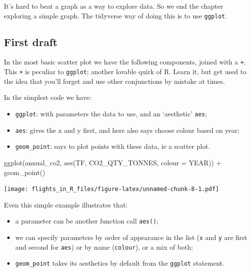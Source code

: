 \documentclass[
]{book}
\newenvironment{Shaded}{\begin{snugshade}}{\end{snugshade}}
\newcommand{\AttributeTok}[1]{\textcolor[rgb]{0.77,0.63,0.00}{#1}}
\newcommand{\FunctionTok}[1]{\textcolor[rgb]{0.00,0.00,0.00}{#1}}
\newcommand{\NormalTok}[1]{#1}
\newcommand{\SpecialCharTok}[1]{\textcolor[rgb]{0.00,0.00,0.00}{#1}}
\providecommand{\tightlist}{%
  \setlength{\itemsep}{0pt}\setlength{\parskip}{0pt}}
\begin{document}
It's hard to beat a graph as a way to explore data. So we end the chapter exploring a simple graph. The tidyverse way of doing this is to use \texttt{ggplot}.

\hypertarget{first-draft}{%
\subsection{First draft}\label{first-draft}}

In the most basic scatter plot we have the following components, joined with a \texttt{+}. This \texttt{+} is peculiar to \texttt{ggplot}; another lovable quirk of R. Learn it, but get used to the idea that you'll forget and use other conjunctions by mistake at times.

In the simplest code we have:

\begin{itemize}
\tightlist
\item
  \texttt{ggplot}: with parameters the data to use, and an `aesthetic' \texttt{aes};
\item
  \texttt{aes}: gives the x and y first, and here also says choose colour based on year;
\item
  \texttt{geom\_point}: says to plot points with these data, ie a scatter plot.
\end{itemize}

\begin{Shaded}
\begin{Highlighting}[]
\FunctionTok{ggplot}\NormalTok{(annual\_co2, }
       \FunctionTok{aes}\NormalTok{(TF, CO2\_QTY\_TONNES, }\AttributeTok{colour =}\NormalTok{ YEAR)) }\SpecialCharTok{+}
  \FunctionTok{geom\_point}\NormalTok{() }
\end{Highlighting}
\end{Shaded}

\texttt{[image: flights\_in\_R\_files/figure-latex/unnamed-chunk-8-1.pdf]}

Even this simple example illustrates that:

\begin{itemize}
\tightlist
\item
  a parameter can be another function call \texttt{aes()};
\item
  we can specify parameters by order of appearance in the list (\texttt{x} and \texttt{y} are first and second for \texttt{aes}) or by name (\texttt{colour}), or a mix of both;
\item
  \texttt{geom\_point} takes its aesthetics by default from the \texttt{ggplot} statement.
\end{itemize}
\end{document}
